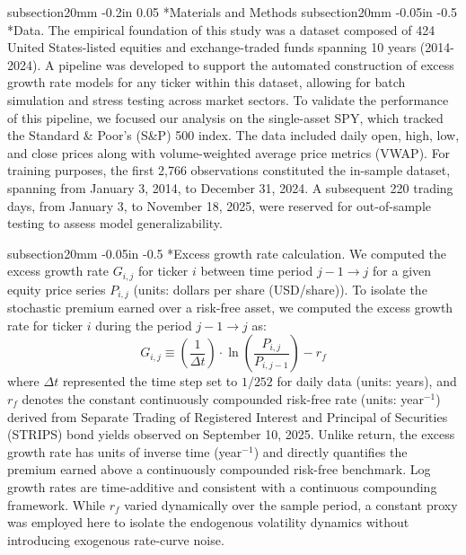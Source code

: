 \documentclass[12pt, letterpaper]{article}
\makeatletter
\renewcommand\subsection{\@startsection
	{subsection}{2}{0mm}
	{-0.05in}
	{-0.5\baselineskip}
	{\normalfont\normalsize\bfseries}}
\renewcommand\section{\@startsection
	{subsection}{2}{0mm}
	{-0.2in}
	{0.05\baselineskip}
	{\normalfont\large\bfseries}}
\makeatother
\begin{document}
\clearpage

\section*{Materials and Methods}\label{sec:methods}
\subsection*{Data.} The empirical foundation of this study was a dataset composed of 424 United States-listed equities and exchange-traded funds spanning 10 years (2014-2024). A pipeline was developed to support the automated construction of excess growth rate models for any ticker within this dataset, allowing for batch simulation and stress testing across market sectors. To validate the performance of this pipeline, we focused our analysis on the single-asset SPY, which tracked the Standard \& Poor's (S\&P) 500 index. The data included daily open, high, low, and close prices along with volume-weighted average price metrics (VWAP). For training purposes, the first 2,766 observations constituted the in-sample dataset, spanning from January 3, 2014, to December 31, 2024. A subsequent 220 trading days, from January 3, to November 18, 2025, were reserved for out-of-sample testing to assess model generalizability. 

\subsection*{Excess growth rate calculation.}
We computed the excess growth rate $G_{i,j}$ for ticker $i$ between time period $j-1\rightarrow{j}$ for a given equity price series $P_{i,j}$ (units: dollars per share (USD/share)). To isolate the stochastic premium earned over a risk-free asset, we computed the excess growth rate for ticker $i$ during the period $j-1\rightarrow{j}$ as:
\begin{equation}
    G_{i,j} \equiv \left( \frac{1}{\Delta t} \right) \cdot \ln \left( \frac{P_{i,j}}{P_{i,j-1}} \right) - r_f
    \label{eq:growth_rate}
\end{equation}
where $\Delta t$ represented the time step set to $1/252$ for daily data (units: years), and $r_f$ denotes the constant continuously compounded risk-free rate (units: year$^{-1}$) derived from Separate Trading of Registered Interest and Principal of Securities (STRIPS) bond yields observed on September 10, 2025. Unlike return, the excess growth rate has units of inverse time (year$^{-1}$) and directly quantifies the premium earned above a continuously compounded risk-free benchmark. Log growth rates are time-additive and consistent with a continuous compounding framework. While $r_f$ varied dynamically over the sample period, a constant proxy was employed here to isolate the endogenous volatility dynamics without introducing exogenous rate-curve noise.
\end{document}
